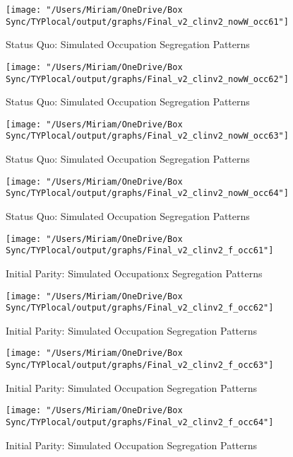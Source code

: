 \documentclass[12pt]{article}
\begin{document}
\begin{center}
\begin{figure}[H]
\centering
\caption{Status Quo: Simulated Occupation Segregation Patterns}
\label{fig:sq1}
\texttt{[image: "/Users/Miriam/OneDrive/Box Sync/TYPlocal/output/graphs/Final\_v2\_clinv2\_nowW\_occ61"]}
\end{figure}
\begin{figure}[H]
\centering
\caption{Status Quo: Simulated Occupation Segregation Patterns}
\label{fig:sq2}
\texttt{[image: "/Users/Miriam/OneDrive/Box Sync/TYPlocal/output/graphs/Final\_v2\_clinv2\_nowW\_occ62"]}
\end{figure}
\begin{figure}[H]
\centering
\caption{Status Quo: Simulated Occupation Segregation Patterns}
\label{fig:sq3}
\texttt{[image: "/Users/Miriam/OneDrive/Box Sync/TYPlocal/output/graphs/Final\_v2\_clinv2\_nowW\_occ63"]}
\end{figure}
\begin{figure}[H]
\centering
\caption{Status Quo: Simulated Occupation Segregation Patterns}
\label{fig:sq4}
\texttt{[image: "/Users/Miriam/OneDrive/Box Sync/TYPlocal/output/graphs/Final\_v2\_clinv2\_nowW\_occ64"]}
\end{figure}
\end{center}

\begin{center}
\begin{figure}[H]
\centering
\caption{Initial Parity: Simulated Occupationx Segregation Patterns}
\label{fig:ip1}
\texttt{[image: "/Users/Miriam/OneDrive/Box Sync/TYPlocal/output/graphs/Final\_v2\_clinv2\_f\_occ61"]}
\end{figure}
\begin{figure}[H]
\centering
\caption{Initial Parity: Simulated Occupation Segregation Patterns}
\label{fig:ip2}
\texttt{[image: "/Users/Miriam/OneDrive/Box Sync/TYPlocal/output/graphs/Final\_v2\_clinv2\_f\_occ62"]}
\end{figure}
\begin{figure}[H]
\centering
\caption{Initial Parity: Simulated Occupation Segregation Patterns}
\label{fig:ip3}
\texttt{[image: "/Users/Miriam/OneDrive/Box Sync/TYPlocal/output/graphs/Final\_v2\_clinv2\_f\_occ63"]}
\end{figure}
\begin{figure}[H]
\centering
\caption{Initial Parity: Simulated Occupation Segregation Patterns}
\label{fig:ip4}
\texttt{[image: "/Users/Miriam/OneDrive/Box Sync/TYPlocal/output/graphs/Final\_v2\_clinv2\_f\_occ64"]}
\end{figure}
\end{center}
\end{document}
